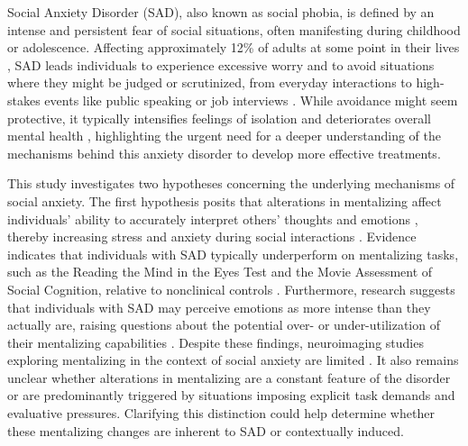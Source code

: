 Social Anxiety Disorder (SAD), also known as social phobia, is defined by an intense and persistent fear of social situations, often manifesting during childhood or adolescence. Affecting approximately 12\% of adults at some point in their lives \citep{kessler2005}, SAD leads individuals to experience excessive worry and to avoid situations where they might be judged or scrutinized, from everyday interactions to high-stakes events like public speaking or job interviews \citep{apa2013}. While avoidance might seem protective, it typically intensifies feelings of isolation and deteriorates overall mental health \citep{lim2016}, highlighting the urgent need for a deeper understanding of the mechanisms behind this anxiety disorder to develop more effective treatments.

This study investigates two hypotheses concerning the underlying mechanisms of social anxiety. The first hypothesis posits that alterations in mentalizing affect individuals' ability to accurately interpret others' thoughts and emotions \citep{hezel2014}, thereby increasing stress and anxiety during social interactions \citep{catalino2012,leary1995}. Evidence indicates that individuals with SAD typically underperform on mentalizing tasks, such as the Reading the Mind in the Eyes Test and the Movie Assessment of Social Cognition, relative to nonclinical controls \citep{alvi2020,baez2023,baron-cohen1997,dziobek2006}. Furthermore, research suggests that individuals with SAD may perceive emotions as more intense than they actually are, raising questions about the potential over- or under-utilization of their mentalizing capabilities \citep{hezel2014,nikolic2019,washburn2016}. Despite these findings, neuroimaging studies exploring mentalizing in the context of social anxiety are limited \citep{sripada2009}. It also remains unclear whether alterations in mentalizing are a constant feature of the disorder or are predominantly triggered by situations imposing explicit task demands and evaluative pressures. Clarifying this distinction could help determine whether these mentalizing changes are inherent to SAD or contextually induced.

